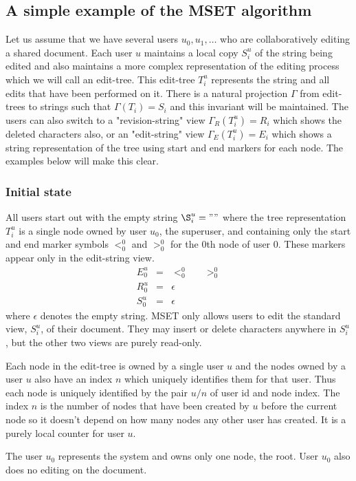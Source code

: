 \documentclass{amsart}
\begin{document}
\subsection{A simple example of the MSET algorithm}
Let us assume that we have several users $u_0,u_1,\ldots$ who are
collaboratively editing a shared document. Each user $u$ maintains a local
copy $S^u_i$ of the string being edited and also maintains a more complex representation of the editing process
which we will call an edit-tree.
This edit-tree $T^u_i$ represents the string and all edits that have been
performed on it. There is a natural projection $\Gamma$ from edit-trees to
strings such that $\Gamma(T_i)=S_i$ and this invariant will be maintained.
The users can also switch to a "revision-string" view $\Gamma_R(T^u_i)=R_i$ which
shows the deleted characters also, or an "edit-string" view $\Gamma_E(T^u_i)=E_i$
which shows a string representation of the tree using start and end markers for each node.  The examples below will
make this clear.

\subsubsection{Initial state}
All users start out with the empty string $\S^u_i=""$ where the
tree representation $T^u_i$ is a single node owned by user $u_0$, the superuser,
and containing only the start and end marker symbols $<^0_0$ and $>^0_0$ for the 0th node of user 0. These markers appear only in 
 the edit-string view.
\begin{align*}
E^u_0 &=& <_0^0 \;\;\;\;\;\; >_0^0 \\
R^u_0 &=& \epsilon\\
S^u_0 &=& \epsilon
\end{align*}
where $\epsilon$ denotes the empty string.
MSET only allows users to edit the standard view, $S^u_i$, of their document. They may insert or delete characters anywhere in $S^u_i$, but the other two views are purely read-only.

Each node in the edit-tree is owned by
a single user $u$ and the nodes owned by a user $u$ also have an index $n$
which uniquely identifies them for that user. 
Thus each node
is uniquely identified by the pair $u/n$ of user id and node index.
The index $n$ is the number of nodes that have been created by $u$ before
the current node so it doesn't depend on how many nodes any other user
has created. It is a purely local counter for user $u$.

The user $u_0$ represents the
system and owns only one node, the root. User $u_0$ also does no editing on
the document.
\end{document}
